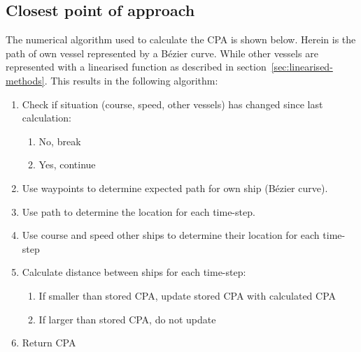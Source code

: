 \subsection{Closest point of approach}
\label{ssec:CPA-calculation}
The numerical algorithm used to calculate the CPA is shown below. Herein is the path of own vessel represented by a Bézier curve. While other vessels are represented with a linearised function as described in section~\ref{sec:linearised-methods}. This results in the following algorithm:
\begin{enumerate}
	\item Check if situation (course, speed, other vessels) has changed since last calculation:
	\begin{enumerate}
		\item No, break
		\item Yes, continue
	\end{enumerate}
	\item Use waypoints to determine expected path for own ship (Bézier curve).
	\item Use path to determine the location for each time-step.
	\item Use course and speed other ships to determine their location for each time-step
	\item Calculate distance between ships for each time-step:
	\begin{enumerate}
		\item If smaller than stored CPA, update stored CPA with calculated CPA
		\item If larger than stored CPA, do not update
	\end{enumerate}
	\item Return CPA
\end{enumerate}

